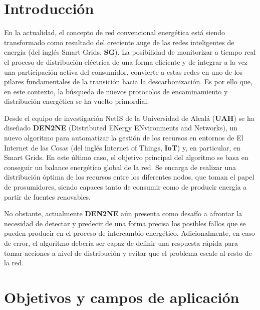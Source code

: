 \newpage
\section{Introducción}
\vspace{0.3cm}

En la actualidad, el concepto de red convencional energética está siendo transformado como resultado del creciente auge de las redes inteligentes de energía (del inglés Smart Grids, \textbf{SG}). La posibilidad de monitorizar a tiempo real el proceso de distribución eléctrica de una forma eficiente y de integrar a la vez una participación activa del consumidor, convierte a estas redes en uno de los pilares fundamentales de la transición hacia la descarbonización. Es por ello que, en este contexto, la búsqueda de nuevos protocolos de encaminamiento y distribución energética se ha vuelto primordial. 

\vspace{0.3cm}

Desde el equipo de investigación NetIS de la Universidad de Alcalá (\textbf{UAH}) se ha diseñado \textbf{DEN2NE} (Distributed ENergy ENvironments and Networks), un nuevo algoritmo para automatizar la gestión de los recursos en entornos de El Internet de las Cosas (del inglés Internet of Things, \textbf{IoT}) y, en particular, en Smart Grids. En este último caso, el objetivo principal del algoritmo se basa en conseguir un balance energético global de la red. Se encarga de realizar una distribución óptima de los recursos entre los diferentes nodos, que toman el papel de prosumidores, siendo capaces tanto de consumir como de producir energía a partir de fuentes renovables.

\vspace{0.3cm}

No obstante, actualmente \textbf{DEN2NE} aún presenta como desafío a afrontar la necesidad de detectar y predecir de una forma precisa los posibles fallos que se pueden producir en el proceso de intercambio energético. Adicionalmente, en caso de error, el algoritmo debería ser capaz de definir una respuesta rápida para tomar acciones a nivel de distribución y evitar que el problema escale al resto de la red.

\vspace{0.3cm}

\section{Objetivos y campos de aplicación}
\vspace{0.3cm}

